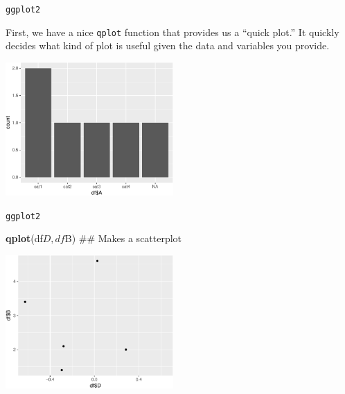 \documentclass[10pt,ignorenonframetext,]{beamer}
\newenvironment{Shaded}{\begin{snugshade}}{\end{snugshade}}
\newcommand{\KeywordTok}[1]{\textcolor[rgb]{0.13,0.29,0.53}{\textbf{{#1}}}}
\newcommand{\NormalTok}[1]{{#1}}
\begin{document}
\begin{frame}[fragile]{\texttt{ggplot2}}

First, we have a nice \texttt{qplot} function that provides us a ``quick
plot.'' It quickly decides what kind of plot is useful given the data
and variables you provide.

\begin{Shaded}
\end{Shaded}

\centerline{\includegraphics[height=2in]{03_UnderstandData_files/figure-beamer/unnamed-chunk-9-1.pdf}}

\end{frame}

\begin{frame}[fragile]{\texttt{ggplot2}}

\begin{Shaded}
\begin{Highlighting}[]
\KeywordTok{qplot}\NormalTok{(df$D, df$B)  ## Makes a scatterplot}
\end{Highlighting}
\end{Shaded}

\centerline{\includegraphics[height=2in]{03_UnderstandData_files/figure-beamer/unnamed-chunk-10-1.pdf}}

\end{frame}
\end{document}
